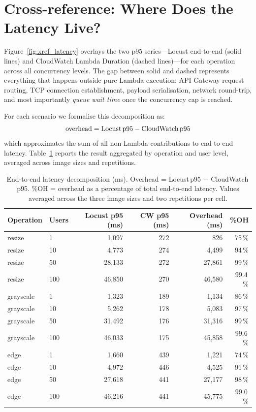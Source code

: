 \documentclass[10pt,twocolumn]{article}
\begin{document}
\section{Cross-reference: Where Does the Latency Live?}
\label{sec:cross}

Figure~\ref{fig:xref_latency} overlays the two p95 series---Locust end-to-end
(solid lines) and CloudWatch Lambda Duration (dashed lines)---for each
operation across all concurrency levels. The gap between solid and dashed
represents everything that happens outside pure Lambda execution: API Gateway
request routing, TCP connection establishment, payload serialisation, network
round-trip, and most importantly \textit{queue wait time} once the concurrency
cap is reached.

For each scenario we formalise this decomposition as:
\[
  \text{overhead} = \text{Locust\,p95} - \text{CloudWatch\,p95}
\]
which approximates the sum of all non-Lambda contributions to end-to-end
latency. Table~\ref{tab:xref} reports the result aggregated by operation and
user level, averaged across image sizes and repetitions.

\begin{table}[h]
\centering
\caption{End-to-end latency decomposition (ms). Overhead = Locust\,p95 $-$
  CloudWatch\,p95. \%OH = overhead as a percentage of total end-to-end latency.
  Values averaged across the three image sizes and two repetitions per cell.}
\label{tab:xref}
\small
\begin{tabular}{llrrrr}
\toprule
\textbf{Operation} & \textbf{Users} &
\textbf{Locust p95 (ms)} & \textbf{CW p95 (ms)} &
\textbf{Overhead (ms)} & \textbf{\%OH} \\
\midrule
resize    &   1 &  1{,}097 &  272 &    826 & 75\,\% \\
resize    &  10 &  4{,}773 &  274 &  4{,}499 & 94\,\% \\
resize    &  50 & 28{,}133 &  272 & 27{,}861 & 99\,\% \\
resize    & 100 & 46{,}850 &  270 & 46{,}580 & 99.4\,\% \\
\midrule
grayscale &   1 &  1{,}323 &  189 &  1{,}134 & 86\,\% \\
grayscale &  10 &  5{,}262 &  178 &  5{,}083 & 97\,\% \\
grayscale &  50 & 31{,}492 &  176 & 31{,}316 & 99\,\% \\
grayscale & 100 & 46{,}033 &  175 & 45{,}858 & 99.6\,\% \\
\midrule
edge      &   1 &  1{,}660 &  439 &  1{,}221 & 74\,\% \\
edge      &  10 &  4{,}972 &  446 &  4{,}525 & 91\,\% \\
edge      &  50 & 27{,}618 &  441 & 27{,}177 & 98\,\% \\
edge      & 100 & 46{,}216 &  441 & 45{,}775 & 99.0\,\% \\
\bottomrule
\end{tabular}
\end{table}
\end{document}
